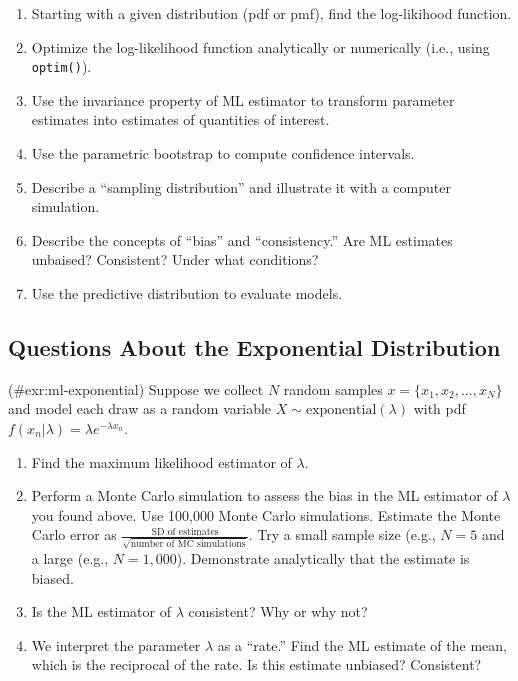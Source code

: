 \documentclass[
]{book}
\providecommand{\tightlist}{%
  \setlength{\itemsep}{0pt}\setlength{\parskip}{0pt}}
\begin{document}
\begin{enumerate}
\def\labelenumi{\arabic{enumi}.}
\tightlist
\item
  Starting with a given distribution (pdf or pmf), find the log-likihood
  function.
\item
  Optimize the log-likelihood function analytically or numerically
  (i.e., using \texttt{optim()}).
\item
  Use the invariance property of ML estimator to transform parameter
  estimates into estimates of quantities of interest.
\item
  Use the parametric bootstrap to compute confidence intervals.
\item
  Describe a ``sampling distribution'' and illustrate it with a computer
  simulation.
\item
  Describe the concepts of ``bias'' and ``consistency.'' Are ML
  estimates unbaised? Consistent? Under what conditions?
\item
  Use the predictive distribution to evaluate models.
\end{enumerate}

\hypertarget{questions-about-the-exponential-distribution}{%
\subsection{Questions About the Exponential
Distribution}\label{questions-about-the-exponential-distribution}}


\protect\hypertarget{exr:ml-exponential}{}{(\#exr:ml-exponential)
}Suppose we collect \(N\) random samples \(x = \{x_1, x_2, ..., x_N\}\)
and model each draw as a random variable
\(X \sim \text{exponential}(\lambda)\) with pdf
\(f(x_n | \lambda) = \lambda e^{-\lambda x_n}\).

\begin{enumerate}
\def\labelenumi{\arabic{enumi}.}
\tightlist
\item
  Find the maximum likelihood estimator of \(\lambda\).
\item
  Perform a Monte Carlo simulation to assess the bias in the ML
  estimator of \(\lambda\) you found above. Use 100,000 Monte Carlo
  simulations. Estimate the Monte Carlo error as
  \(\frac{\text{SD of estimates}}{\sqrt{\text{number of MC simulations}}}\).
  Try a small sample size (e.g., \(N = 5\) and a large (e.g.,
  \(N = 1,000\)). Demonstrate analytically that the estimate is biased.
\item
  Is the ML estimator of \(\lambda\) consistent? Why or why not?
\item
  We interpret the parameter \(\lambda\) as a ``rate.'' Find the ML
  estimate of the mean, which is the reciprocal of the rate. Is this
  estimate unbiased? Consistent? 
\end{enumerate}
\end{document}
